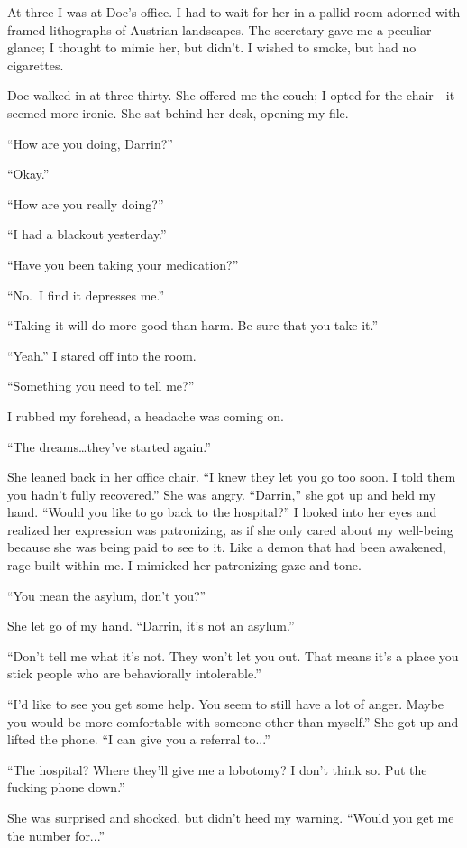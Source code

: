At three I was at Doc's office. I had to wait for her in a pallid room
adorned with framed lithographs of Austrian landscapes. The secretary
gave me a peculiar glance; I thought to mimic her, but didn't. I wished
to smoke, but had no cigarettes.

Doc walked in at three-thirty. She offered me the couch; I opted for the
chair---it seemed more ironic. She sat behind her desk, opening my file.

``How are you doing, Darrin?''

``Okay.''

``How are you really doing?''

``I had a blackout yesterday.''

``Have you been taking your medication?''

``No.~I find it depresses me.''

``Taking it will do more good than harm. Be sure that you take it.''

``Yeah.'' I stared off into the room.

``Something you need to tell me?''

I rubbed my forehead, a headache was coming on.

``The dreams\ldots they've started again.''

She leaned back in her office chair. ``I knew they let you go too soon.
I told them you hadn't fully recovered.'' She was angry. ``Darrin,'' she
got up and held my hand. ``Would you like to go back to the hospital?''
I looked into her eyes and realized her expression was patronizing, as
if she only cared about my well-being because she was being paid to see
to it. Like a demon that had been awakened, rage built within me. I
mimicked her patronizing gaze and tone.

``You mean the asylum, don't you?''

She let go of my hand. ``Darrin, it's not an asylum.''

``Don't tell me what it's not. They won't let you out. That means it's a
place you stick people who are behaviorally intolerable.''

``I'd like to see you get some help. You seem to still have a lot of
anger. Maybe you would be more comfortable with someone other than
myself.'' She got up and lifted the phone. ``I can give you a referral
to...''

``The hospital? Where they'll give me a lobotomy? I don't think so. Put
the fucking phone down.''

She was surprised and shocked, but didn't heed my warning. ``Would you
get me the number for...''

